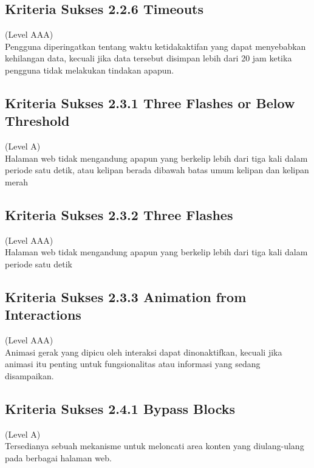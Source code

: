 \subsection{Kriteria Sukses 2.2.6 Timeouts}
\label{subsec:kriteria_2.2.6}
(Level AAA) \\

Pengguna diperingatkan tentang waktu ketidakaktifan yang dapat menyebabkan kehilangan data, kecuali jika data tersebut disimpan lebih dari 20 jam ketika pengguna tidak melakukan tindakan apapun.

\subsection{Kriteria Sukses 2.3.1 Three Flashes or Below Threshold}
\label{subsec:kriteria_2.3.1}
(Level A) \\

Halaman web tidak mengandung apapun yang berkelip lebih dari tiga kali dalam periode satu detik, atau kelipan berada dibawah batas umum kelipan dan kelipan merah

\subsection{Kriteria Sukses 2.3.2 Three Flashes}
\label{subsec:kriteria_2.3.2}
(Level AAA) \\

Halaman web tidak mengandung apapun yang berkelip lebih dari tiga kali dalam periode satu detik


\subsection{Kriteria Sukses 2.3.3 Animation from Interactions}
\label{subsec:kriteria_2.3.3}
(Level AAA) \\

Animasi gerak yang dipicu oleh interaksi dapat dinonaktifkan, kecuali jika animasi itu penting untuk fungsionalitas atau informasi yang sedang disampaikan.

\subsection{Kriteria Sukses 2.4.1 Bypass Blocks}
\label{subsec:kriteria_2.4.1}
(Level A) \\

Tersedianya sebuah mekanisme untuk meloncati area konten yang diulang-ulang pada berbagai halaman web.

